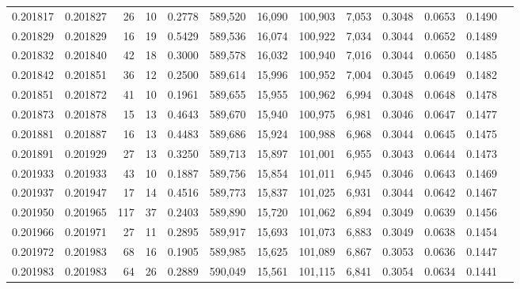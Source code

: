 \begin{tabular}{rrrrrrrrrrrrr}
0.201817 & 0.201827 &    26 &  10 &                                     0.2778 & 589,520 &  16,090 & 100,903 &   7,053 & 0.3048 & 0.0653 & 0.1490 \\
0.201829 & 0.201829 &    16 &  19 &                                     0.5429 & 589,536 &  16,074 & 100,922 &   7,034 & 0.3044 & 0.0652 & 0.1489 \\
0.201832 & 0.201840 &    42 &  18 &                                     0.3000 & 589,578 &  16,032 & 100,940 &   7,016 & 0.3044 & 0.0650 & 0.1485 \\
0.201842 & 0.201851 &    36 &  12 &                                     0.2500 & 589,614 &  15,996 & 100,952 &   7,004 & 0.3045 & 0.0649 & 0.1482 \\
0.201851 & 0.201872 &    41 &  10 &                                     0.1961 & 589,655 &  15,955 & 100,962 &   6,994 & 0.3048 & 0.0648 & 0.1478 \\
0.201873 & 0.201878 &    15 &  13 &                                     0.4643 & 589,670 &  15,940 & 100,975 &   6,981 & 0.3046 & 0.0647 & 0.1477 \\
0.201881 & 0.201887 &    16 &  13 &                                     0.4483 & 589,686 &  15,924 & 100,988 &   6,968 & 0.3044 & 0.0645 & 0.1475 \\
0.201891 & 0.201929 &    27 &  13 &                                     0.3250 & 589,713 &  15,897 & 101,001 &   6,955 & 0.3043 & 0.0644 & 0.1473 \\
0.201933 & 0.201933 &    43 &  10 &                                     0.1887 & 589,756 &  15,854 & 101,011 &   6,945 & 0.3046 & 0.0643 & 0.1469 \\
0.201937 & 0.201947 &    17 &  14 &                                     0.4516 & 589,773 &  15,837 & 101,025 &   6,931 & 0.3044 & 0.0642 & 0.1467 \\
0.201950 & 0.201965 &   117 &  37 &                                     0.2403 & 589,890 &  15,720 & 101,062 &   6,894 & 0.3049 & 0.0639 & 0.1456 \\
0.201966 & 0.201971 &    27 &  11 &                                     0.2895 & 589,917 &  15,693 & 101,073 &   6,883 & 0.3049 & 0.0638 & 0.1454 \\
0.201972 & 0.201983 &    68 &  16 &                                     0.1905 & 589,985 &  15,625 & 101,089 &   6,867 & 0.3053 & 0.0636 & 0.1447 \\
0.201983 & 0.201983 &    64 &  26 &                                     0.2889 & 590,049 &  15,561 & 101,115 &   6,841 & 0.3054 & 0.0634 & 0.1441 \\

\end{tabular}
